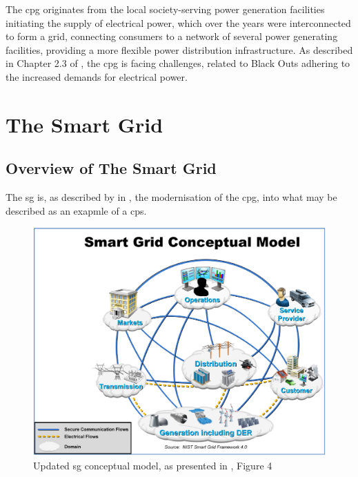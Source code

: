 The \acrlong{cpg} originates from the local society-serving power generation facilities initiating the supply of electrical power, which over the years were interconnected to form a grid, connecting consumers to a network of several power generating facilities, providing a more flexible power distribution infrastructure. 
As described in Chapter 2.3 of \cite{Rihan2018} %
, the \acrlong{cpg} is facing challenges, related to Black Outs adhering to the increased demands for electrical power. 


\section{The Smart Grid}
\subsection{Overview of The Smart Grid}

The \acrfull{sg} is, as described by \citeauthor{humayed2017cyber} in \cite{humayed2017cyber}, the modernisation of the \acrfull{cpg}, into what may be described as an exapmle of a \acrfull{cps}.


\begin{figure}[t]
\includegraphics[width=\linewidth]{figures/NIST-SmartGRID-ConceptualModel.png}
\caption[Smart Grid Conceptual Model]{Updated \acrlong{sg} conceptual model, as presented in \cite[p. 13]{gopstein2021nist}, Figure 4}
\label{fig:NIST-SmartGRID-ConceptualModel}
\end{figure}

